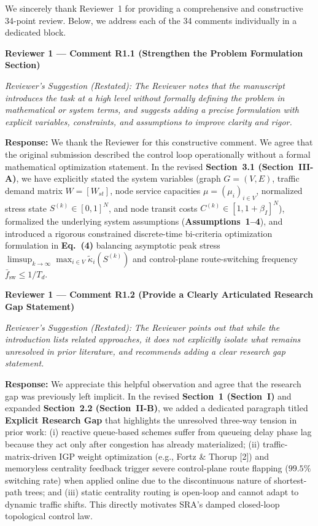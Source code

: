 \documentclass[11pt,a4paper]{article}
\newcommand{\cbox}[2]{%
  \vspace{0.6em}\noindent\textbf{#1}\par\smallskip
  \noindent\textit{Reviewer's Suggestion (Restated):} \textit{#2}\par\smallskip
}
\begin{document}
We sincerely thank Reviewer~1 for providing a comprehensive and constructive 34-point review. Below, we address each of the 34 comments individually in a dedicated block.

\cbox{Reviewer 1 --- Comment R1.1 (Strengthen the Problem Formulation Section)}{The Reviewer notes that the manuscript introduces the task at a high level without formally defining the problem in mathematical or system terms, and suggests adding a precise formulation with explicit variables, constraints, and assumptions to improve clarity and rigor.}

\noindent\textbf{Response:} We thank the Reviewer for this constructive comment. We agree that the original submission described the control loop operationally without a formal mathematical optimization statement. In the revised \textbf{Section~3.1 (Section~III-A)}, we have explicitly stated the system variables (graph $G=(V,E)$, traffic demand matrix $W=[W_{st}]$, node service capacities $\mu=(\mu_i)_{i\in V}$, normalized stress state $S^{(k)}\in [0,1]^N$, and node transit costs $C^{(k)}\in [1, 1+\beta_I]^N$), formalized the underlying system assumptions (\textbf{Assumptions~1--4}), and introduced a rigorous constrained discrete-time bi-criteria optimization formulation in \textbf{Eq.~(4)} balancing asymptotic peak stress $\limsup_{k\to\infty}\max_{i\in V}\widetilde{\kappa}_i(S^{(k)})$ and control-plane route-switching frequency $\bar{f}_{\text{sw}} \le 1/T_d$.

\hrulefill

\cbox{Reviewer 1 --- Comment R1.2 (Provide a Clearly Articulated Research Gap Statement)}{The Reviewer points out that while the introduction lists related approaches, it does not explicitly isolate what remains unresolved in prior literature, and recommends adding a clear research gap statement.}

\noindent\textbf{Response:} We appreciate this helpful observation and agree that the research gap was previously left implicit. In the revised \textbf{Section~1 (Section~I)} and expanded \textbf{Section~2.2 (Section~II-B)}, we added a dedicated paragraph titled \textbf{Explicit Research Gap} that highlights the unresolved three-way tension in prior work: (i) reactive queue-based schemes suffer from queueing delay phase lag because they act only after congestion has already materialized; (ii) traffic-matrix-driven IGP weight optimization (e.g., Fortz \& Thorup [2]) and memoryless centrality feedback trigger severe control-plane route flapping ($99.5\%$ switching rate) when applied online due to the discontinuous nature of shortest-path trees; and (iii) static centrality routing is open-loop and cannot adapt to dynamic traffic shifts. This directly motivates SRA's damped closed-loop topological control law.
\end{document}
